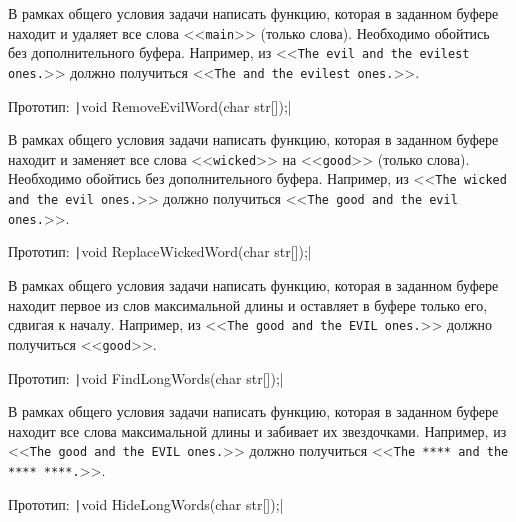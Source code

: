 
\begin{zztask}
В рамках общего условия задачи написать функцию, которая в заданном буфере
находит и удаляет все слова <<\texttt{main}>> (только слова).
Необходимо обойтись без дополнительного буфера.
Например, из
<<\texttt{The evil and the evilest ones.}>>
должно получиться
<<\texttt{The  and the evilest ones.}>>.

Прототип: \texttt|void RemoveEvilWord(char str[]);|
\end{zztask}


\begin{zztask}
В рамках общего условия задачи написать функцию, которая в заданном буфере
находит и заменяет все слова <<\texttt{wicked}>> на <<\texttt{good}>> (только слова).
Необходимо обойтись без дополнительного буфера.
Например, из
<<\texttt{The wicked and the evil ones.}>>
должно получиться
<<\texttt{The good and the evil ones.}>>.

Прототип: \texttt|void ReplaceWickedWord(char str[]);|
\end{zztask}


\begin{zztask}
В рамках общего условия задачи написать функцию, которая в заданном буфере
находит первое из слов максимальной длины и оставляет в буфере только его,
сдвигая к началу.
Например, из
<<\texttt{The good and the EVIL ones.}>>
должно получиться
<<\texttt{good}>>.

Прототип: \texttt|void FindLongWords(char str[]);|
\end{zztask}


\begin{zztask}
В рамках общего условия задачи написать функцию, которая в заданном буфере
находит все слова максимальной длины и забивает их звездочками.
Например, из
<<\texttt{The good and the EVIL ones.}>>
должно получиться
<<\texttt{The **** and the **** ****.}>>.

Прототип: \texttt|void HideLongWords(char str[]);|
\end{zztask}

